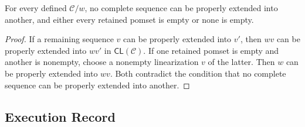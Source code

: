 \begin{lemma}
\label{lem:observable-completion}
For every defined \(\mathcal C/w\), no complete sequence can be properly extended into another, and either every retained pomset is empty or none is empty.
\end{lemma}
\begin{proof}
If a remaining sequence \(v\) can be properly extended into \(v'\), then \(wv\) can be properly extended into \(wv'\) in \(\mathsf{CL}(\mathcal C)\).
If one retained pomset is empty and another is nonempty, choose a nonempty linearization \(v\) of the latter.
Then \(w\) can be properly extended into \(wv\).
Both contradict the condition that no complete sequence can be properly extended into another.
\end{proof}

\subsection{Execution Record}

